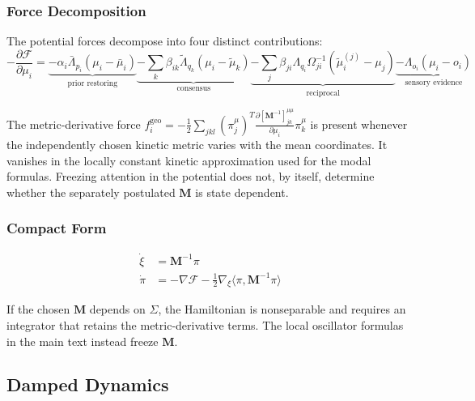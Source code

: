\documentclass[12pt]{article}
\begin{document}
\subsubsection{Force Decomposition}

The potential forces decompose into four distinct contributions:
\begin{equation}
\boxed{
-\frac{\partial \mathcal{F}}{\partial \mu_i} = \underbrace{-\alpha_i\bar{\Lambda}_{p_i}(\mu_i - \bar{\mu}_i)}_{\text{prior restoring}} \underbrace{- \sum_k \beta_{ik}\tilde{\Lambda}_{q_k}(\mu_i - \tilde{\mu}_k)}_{\text{consensus}} \underbrace{- \sum_j \beta_{ji}\Lambda_{q_i}\Omega_{ji}^{-1}(\tilde{\mu}_i^{(j)} - \mu_j)}_{\text{reciprocal}} \underbrace{- \Lambda_{o_i}(\mu_i - o_i)}_{\text{sensory evidence}}
}
\label{eq:force_decomposition}
\end{equation}

The metric-derivative force $f_i^{\text{geo}}=-\frac12\sum_{jkl}(\pi_j^\mu)^T\frac{\partial[\mathbf M^{-1}]_{jk}^{\mu\mu}}{\partial\mu_i}\pi_k^\mu$ is present whenever the independently chosen kinetic metric varies with the mean coordinates.  It vanishes in the locally constant kinetic approximation used for the modal formulas.  Freezing attention in the potential does not, by itself, determine whether the separately postulated $\mathbf M$ is state dependent.

\subsubsection{Compact Form}

\begin{equation}
\boxed{
\begin{aligned}
\dot{\xi} &= \mathbf{M}^{-1}\pi \\
\dot{\pi} &= -\nabla\mathcal{F} - \frac{1}{2}\nabla_\xi\langle\pi, \mathbf{M}^{-1}\pi\rangle
\end{aligned}
}
\end{equation}

If the chosen $\mathbf M$ depends on $\Sigma$, the Hamiltonian is nonseparable and requires an integrator that retains the metric-derivative terms.  The local oscillator formulas in the main text instead freeze $\mathbf M$.

\subsection{Damped Dynamics}
\end{document}
